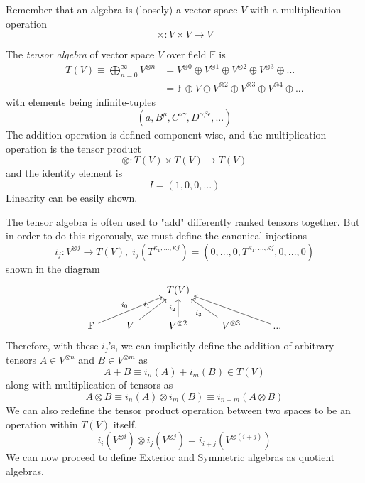 \documentclass{article}
\begin{document}
  Remember that an algebra is (loosely) a vector space $V$ with a multiplication operation
  \begin{equation}
    \times: V \times V \longrightarrow V
  \end{equation}

  \begin{definition}
    The \textit{tensor algebra} of vector space $V$ over field $\mathbb{F}$ is 
    \begin{align*}
      T(V) \equiv \bigoplus_{n = 0}^{\infty} V^{\otimes n} & = V^{\otimes 0} \oplus V^{\otimes 1} \oplus V^{\otimes 2} \oplus V^{\otimes 3} \oplus ... \\
      & = \mathbb{F} \oplus V \oplus V^{\otimes 2} \oplus V^{\otimes 3} \oplus V^{\otimes 4} \oplus ...
    \end{align*}
    with elements being infinite-tuples
    \begin{equation}
      (a, B^\mu, C^{\nu \gamma}, D^{\alpha \beta \epsilon}, ...)
    \end{equation}
    The addition operation is defined component-wise, and the multiplication operation is the tensor product 
    \begin{equation}
      \otimes: T(V) \times T(V) \longrightarrow T(V)
    \end{equation}
    and the identity element is
    \begin{equation}
      I = (1, 0, 0, ...)
    \end{equation}
    Linearity can be easily shown. 
  \end{definition}

  The tensor algebra is often used to "add" differently ranked tensors together. But in order to do this rigorously, we must define the canonical injections
  \begin{equation}
    i_j: V^{\otimes j} \longrightarrow T(V), \; i_j (T^{\kappa_1, ..., \kappa j}) = (0, ...,0, T^{\kappa_1, ..., \kappa j}, 0, ..., 0) 
  \end{equation}
  shown in the diagram
  \[\begin{tikzcd}
      & & T(V) & & \\
      \mathbb{F} \arrow{urr}{i_0} & V \arrow{ur}{i_1} & V^{\otimes 2} \arrow{u}{i_2} & V^{\otimes 3} \arrow{ul}{i_3} & ... \arrow{ull}
  \end{tikzcd}\]
  Therefore, with these $i_j$'s, we can implicitly define the addition of arbitrary tensors $A \in V^{\otimes n}$ and $B \in V^{\otimes m}$ as 
  \begin{equation}
    A + B \equiv i_n (A) + i_m (B) \in T(V)
  \end{equation}
  along with multiplication of tensors as
  \begin{equation}
    A \otimes B \equiv i_n(A) \otimes i_m(B) \equiv i_{n+m} (A \otimes B)
  \end{equation}
  We can also redefine the tensor product operation between two spaces to be an operation within $T(V)$ itself. 
  \begin{equation}
    i_i(V^{\otimes i}) \otimes i_j( V^{\otimes j}) = i_{i+j} (V^{\otimes (i+j)})
  \end{equation}
  We can now proceed to define Exterior and Symmetric algebras as quotient algebras. 
\end{document}
